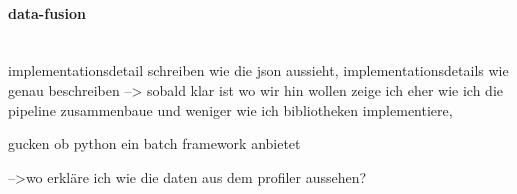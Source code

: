 \paragraph{data-fusion}\mbox{}\\

implementationsdetail schreiben wie die json aussieht, implementationsdetails wie genau beschreiben --> sobald klar ist wo wir hin wollen zeige ich eher wie ich die pipeline zusammenbaue und weniger wie ich bibliotheken implementiere,

gucken ob python ein batch framework anbietet

-->wo erkläre ich wie die daten aus dem profiler aussehen?